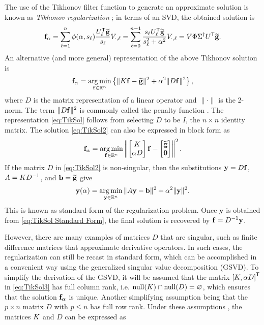 The use of the Tikhonov filter function to generate an approximate solution is known as \textit{Tikhonov regularization} \cite{Tikh1963}; in terms of an SVD, the obtained solution is
\begin{equation}
\mathbf{f}_\alpha = \sum_{\ell = 1}^n \phi(\alpha,s_\ell)\frac{{{U}^\mathsf{T}_\ell}\widetilde{\mathbf{g}}}{s_\ell}V_{\cdot,\ell} = \sum_{\ell = 0}^{n-1} \frac{s_\ell{{U}^\mathsf{T}_\ell}\widetilde{\mathbf{g}}}{s_\ell^2 + \alpha^2}V_{\cdot,\ell} = V\Phi\Sigma^\dagger {U}^\mathsf{T}\widetilde{\mathbf{g}}.
\label{eq:TikSol}
\end{equation}
An alternative (and more general) representation of the above Tikhonov solution is
\begin{equation}
\mathbf{f}_\alpha = \operatorname*{arg\,min}_{\mathbf{f} \in \mathbb{R}^n} \left\{\|K\mathbf{f} - \widetilde{\mathbf{g}}\|^2 + \alpha^2\|D\mathbf{f}\|^2\right\},
\label{eq:TikSol2}
\end{equation}
where $D$ is the matrix representation of a linear operator and $\|\cdot\|$ is the 2-norm. The term $\|D\mathbf{f}\|^2$ is commonly called the penalty function \cite{Vogel:2002}. The representation \eqref{eq:TikSol} follows from selecting $D$ to be $I$, the $n \times n$ identity matrix. The solution \eqref{eq:TikSol2} can also be expressed in block form as
\begin{equation}
\mathbf{f}_\alpha = \operatorname*{arg\,min}_{\mathbf{f} \in \mathbb{R}^n} \left\| \begin{bmatrix}
K \\
\alpha D
\end{bmatrix}\mathbf{f} - \begin{bmatrix}
\widetilde{\mathbf{g}} \\
\boldsymbol{0}
\end{bmatrix} \right\|^2.
\label{eq:TikSol3}
\end{equation}
If the matrix $D$ in \eqref{eq:TikSol2} is non-singular, then the substitutions $\mathbf{y} = D\mathbf{f}$, $A = K{D}^{-1}$, and $\mathbf{b} = \widetilde{\mathbf{g}}$ give
\begin{equation}
\mathbf{y}(\alpha) = \operatorname*{arg\,min}_{\mathbf{y} \in \mathbb{R}^n} \|A\mathbf{y} - \mathbf{b}\|^2 + \alpha^2\|\mathbf{y}\|^2.
\label{eq:TikSol Standard Form}
\end{equation}
This is known as standard form of the regularization problem. Once $\mathbf{y}$ is obtained from \eqref{eq:TikSol Standard Form}, the final solution is recovered by $\mathbf{f} = D^{-1}\mathbf{y}$.  \par 
However, there are many examples of matrices $D$ that are singular, such as finite difference matrices that approximate derivative operators. In such cases, the regularization can still be recast in standard form, which can be accomplished in a convenient way using the generalized singular value decomposition (GSVD). To simplify the derivation of the GSVD, it will be assumed that the matrix ${[K, \alpha D]}^\mathsf{T}$ in \eqref{eq:TikSol3} has full column rank, i.e. $\operatorname{null}(K) \cap \operatorname{null}(D) = \varnothing$, which ensures that the solution $\mathbf{f}_\alpha$ is unique. Another simplifying assumption being that the $p \times n$ matrix $D$ with $p \leq n$ has full row rank. Under these assumptions \cite[p.~104]{ABT}, the matrices $K$ and $D$ can be expressed as
